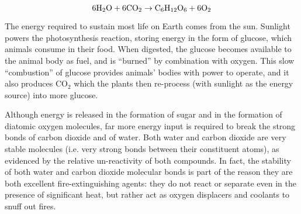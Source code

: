 $$\hbox{6H}_2\hbox{O} + \hbox{6CO}_2 \to \hbox{C}_6\hbox{H}_{12}\hbox{O}_6 + \hbox{6O}_2$$

\vskip 10pt

The energy required to sustain most life on Earth comes from the sun.  Sunlight powers the photosynthesis reaction, storing energy in the form of glucose, which animals consume in their food.  When digested, the glucose becomes available to the animal body as fuel, and is ``burned'' by combination with oxygen.  This slow ``combustion'' of glucose provides animals' bodies with power to operate, and it also produces CO$_{2}$ which the plants then re-process (with sunlight as the energy source) into more glucose.

Although energy is released in the formation of sugar and in the formation of diatomic oxygen molecules, far more energy input is required to break the strong bonds of carbon dioxide and of water.  Both water and carbon dioxide are very stable molecules (i.e. very strong bonds between their constituent atoms), as evidenced by the relative un-reactivity of both compounds.  In fact, the stability of both water and carbon dioxide molecular bonds is part of the reason they are both excellent fire-extinguishing agents: they do not react or separate even in the presence of significant heat, but rather act as oxygen displacers and coolants to snuff out fires.




